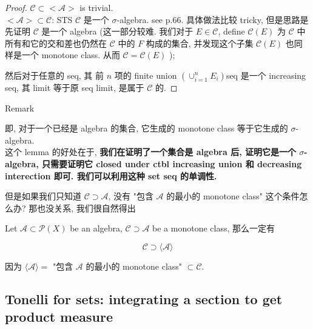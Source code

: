 \documentclass{qlnotes-export}
\begin{document}
\begin{proof}

\(\mathcal{C} \subset < \mathcal{A} >\) is trivial.\\
\(< \mathcal{A} > \subset \mathcal{C}\): STS \(\mathcal{C}\) 是一个 \(\sigma\)-algebra. see p.66. 具体做法比较 tricky, 但是思路是先证明 \(\mathcal{C}\) 是一个 algebra (这一部分较难. 我们对于 \(E \in \mathcal{C}\), define \(\mathcal{C}(E)\) 为 \(\mathcal{C}\) 中所有和它的交和差也仍然在 \(\mathcal{C}\) 中的 \(F\) 构成的集合, 并发现这个子集 \(\mathcal{C}(E)\) 也同样是一个 monotone class. 从而 \(\mathcal{C} = \mathcal{C}(E)\) );

然后对于任意的 seq, 其 前 \(n\) 项的 finite union \(( \cup_{i = 1}^{n}E_{i})\)seq 是一个 increasing seq, 其 limit 等于原 seq limit, 是属于 \(\mathcal{C}\) 的.

\end{proof}

\begin{qlremark}{Remark}

即, 对于一个已经是 algebra 的集合, 它生成的 monotone class 等于它生成的 \(\sigma\)-algebra.\\
这个 lemma 的好处在于, \textbf{我们在证明了一个集合是 algebra 后, 证明它是一个 \(\sigma\)-algebra, 只需要证明它 closed under ctbl increasing union 和 decreasing interection 即可. 我们可以利用这种 set seq 的单调性.}

\end{qlremark}

但是如果我们只知道 \(\mathcal{C} \supset \mathcal{A}\), 没有 "包含 \(\mathcal{A}\) 的最小的 monotone class" 这个条件怎么办? 那也没关系, 我们很自然得出

\begin{corollary}\label{cor-06-product-measure-fubini-tonelli-corollary-004}

Let \(\mathcal{A} \subset \mathcal{P}(X)\) be an algebra, \(\mathcal{C} \supset \mathcal{A}\) be a monotone class, 那么一定有

\[\mathcal{C} \supset \langle\mathcal{A}\rangle\]

\end{corollary}

因为 \(\langle\mathcal{A}\rangle =\) "包含 \(\mathcal{A}\) 的最小的 monotone class" \(\subset \mathcal{C}\).

\subsection{Tonelli for sets: integrating a section to get product measure}\label{tonelli-for-sets-integrating-a-section-to-get-product-measure}
\end{document}

